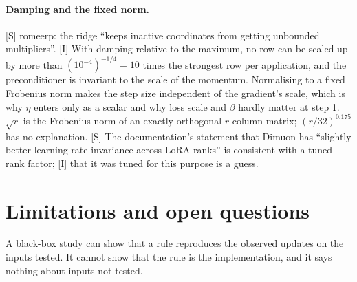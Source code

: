 \documentclass[11pt]{article}
\begin{document}
\paragraph{Damping and the fixed norm.} [S] romeerp: the ridge ``keeps inactive coordinates from
getting unbounded multipliers''. [I] With damping relative to the maximum, no row can be scaled up by
more than $(10^{-4})^{-1/4}=10$ times the strongest row per application, and the preconditioner is
invariant to the scale of the momentum. Normalising to a fixed Frobenius norm makes the step size
independent of the gradient's scale, which is why $\eta$ enters only as a scalar and why loss scale and
$\beta$ hardly matter at step 1. $\sqrt r$ is the Frobenius norm of an exactly orthogonal $r$-column
matrix; $(r/32)^{0.175}$ has no explanation. [S] The documentation's statement that Dimuon has
``slightly better learning-rate invariance across LoRA ranks'' is consistent with a tuned rank factor;
[I] that it was tuned for this purpose is a guess.

\section{Limitations and open questions}\label{sec:limits}

A black-box study can show that a rule reproduces the observed updates on the inputs tested. It cannot
show that the rule is the implementation, and it says nothing about inputs not tested.
\end{document}
